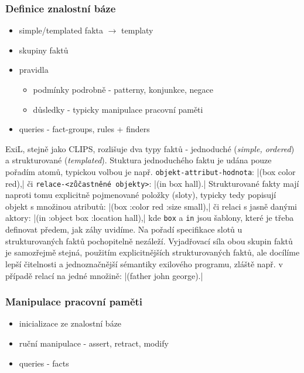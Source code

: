 \FloatBarrier

\subsubsection{Definice znalostní báze}
\begin{framed}
  \begin{itemize}
    \item simple/templated fakta $\rightarrow$ templaty
    \item skupiny faktů
    \item pravidla
      \begin{itemize}
        \item podmínky podrobně - patterny, konjunkce, negace
        \item důsledky - typicky manipulace pracovní paměti
      \end{itemize}
    \item queries - fact-groups, rules + finders
  \end{itemize}
\end{framed}

ExiL, stejně jako CLIPS, rozlišuje dva typy faktů - jednoduché (\emph{simple,
ordered}) a strukturované (\emph{templated}). Stuktura jednoduchého faktu je udána
pouze pořadím atomů, typickou volbou je např. \verb|objekt-attribut-hodnota|:
\cl|(box color red),| či \verb|relace-<zůčastněné objekty>|: \cl|(in box hall).|
Strukturované fakty mají naproti tomu explicitně pojmenované položky (sloty),
typicky tedy popisují objekt s množinou atributů: \cl|(box :color red :size small),|
či relaci s jasně danými aktory: \cl|(in :object box :location hall),| kde
\verb|box| a \verb|in| jsou šablony, které je třeba definovat předem, jak záhy
uvidíme. Na pořadí specifikace slotů u strukturovaných faktů pochopitelně
nezáleží. Vyjadřovací síla obou skupin faktů je samozřejmě stejná, použitím
explicitnějších strukturovaných faktů, ale docílíme lepší čitelnosti a
jednoznačnější sémantiky exilového programu, zláště např. v případě relací na
jedné množině: \cl|(father john george).|

\subsubsection{Manipulace pracovní paměti}
\begin{framed}
  \begin{itemize}
    \item inicializace ze znalostní báze
    \item ruční manipulace - assert, retract, modify
    \item queries - facts
  \end{itemize}
\end{framed}


